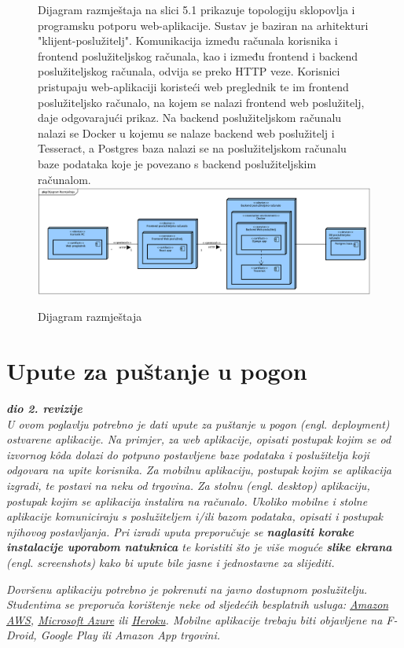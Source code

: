 			\begin{figure}[H]
				Dijagram razmještaja na slici 5.1 prikazuje topologiju sklopovlja i programsku potporu web-aplikacije. Sustav je baziran na arhitekturi
				"klijent-poslužitelj". Komunikacija između računala korisnika i frontend poslužiteljskog računala, kao i između frontend i backend poslužiteljskog
				računala, odvija se preko HTTP veze. Korisnici pristupaju web-aplikaciji koristeći web preglednik te im frontend poslužiteljsko računalo, na kojem
				se nalazi frontend web poslužitelj, daje odgovarajući prikaz. Na backend poslužiteljskom računalu nalazi se Docker u kojemu se nalaze backend web
				poslužitelj i Tesseract, a Postgres baza nalazi se na poslužiteljskom računalu baze podataka koje je povezano s backend poslužiteljskim računalom.
				\newline
				\includegraphics[width=\textwidth]{slike/Deployment.png}
				\caption{Dijagram razmještaja}
				\label{fig:Deployment}
			\end{figure}
			\eject 
		
		\section{Upute za puštanje u pogon}
		
			\textbf{\textit{dio 2. revizije}}\\
		
			 \textit{U ovom poglavlju potrebno je dati upute za puštanje u pogon (engl. deployment) ostvarene aplikacije. Na primjer, za web aplikacije, opisati postupak kojim se od izvornog kôda dolazi do potpuno postavljene baze podataka i poslužitelja koji odgovara na upite korisnika. Za mobilnu aplikaciju, postupak kojim se aplikacija izgradi, te postavi na neku od trgovina. Za stolnu (engl. desktop) aplikaciju, postupak kojim se aplikacija instalira na računalo. Ukoliko mobilne i stolne aplikacije komuniciraju s poslužiteljem i/ili bazom podataka, opisati i postupak njihovog postavljanja. Pri izradi uputa preporučuje se \textbf{naglasiti korake instalacije uporabom natuknica} te koristiti što je više moguće \textbf{slike ekrana} (engl. screenshots) kako bi upute bile jasne i jednostavne za slijediti.}
			
			
			 \textit{Dovršenu aplikaciju potrebno je pokrenuti na javno dostupnom poslužitelju. Studentima se preporuča korištenje neke od sljedećih besplatnih usluga: \href{https://aws.amazon.com/}{Amazon AWS}, \href{https://azure.microsoft.com/en-us/}{Microsoft Azure} ili \href{https://www.heroku.com/}{Heroku}. Mobilne aplikacije trebaju biti objavljene na F-Droid, Google Play ili Amazon App trgovini.}
			
			
			\eject 